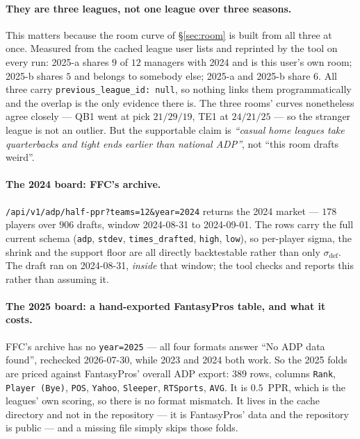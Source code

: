 \documentclass[10pt,a4paper]{article}
\theoremstyle{plain}
\theoremstyle{definition}
\theoremstyle{remark}
\newcommand{\code}[1]{\texttt{\small #1}}
\begin{document}
\paragraph{They are three leagues, not one league over three seasons.} This matters
because the room curve of \S\ref{sec:room} is built from all three at once. Measured from
the cached league user lists and reprinted by the tool on every run: 2025-a shares $9$ of
$12$ managers with 2024 and is this user's own room; 2025-b shares $5$ and belongs to
somebody else; 2025-a and 2025-b share $6$. All three carry \code{previous\_league\_id:
null}, so nothing links them programmatically and the overlap is the only evidence there
is. The three rooms' curves nonetheless agree closely --- QB1 went at pick $21 / 29 / 19$,
TE1 at $24 / 21 / 25$ --- so the stranger league is not an outlier. But the supportable
claim is \emph{``casual home leagues take quarterbacks and tight ends earlier than
national ADP''}, not ``this room drafts weird''.

\paragraph{The 2024 board: FFC's archive.}
\code{/api/v1/adp/half-ppr?teams=12\&year=2024} returns the 2024 market --- $178$ players
over $906$ drafts, window 2024-08-31 to 2024-09-01. The rows carry the full current schema
(\code{adp}, \code{stdev}, \code{times\_drafted}, \code{high}, \code{low}), so per-player
sigma, the shrink and the support floor are all directly backtestable rather than only
$\sigma_{\text{def}}$. The draft ran on 2024-08-31, \emph{inside} that window; the tool
checks and reports this rather than assuming it.

\paragraph{The 2025 board: a hand-exported FantasyPros table, and what it costs.}
FFC's archive has no \code{year=2025} --- all four formats answer ``No ADP data found'',
rechecked 2026-07-30, while 2023 and 2024 both work. So the 2025 folds are priced against
FantasyPros' overall ADP export: $389$ rows, columns \code{Rank}, \code{Player (Bye)},
\code{POS}, \code{Yahoo}, \code{Sleeper}, \code{RTSports}, \code{AVG}. It is $0.5$~PPR,
which is the leagues' own scoring, so there is no format mismatch. It lives in the cache
directory and not in the repository --- it is FantasyPros' data and the repository is
public --- and a missing file simply skips those folds.
\end{document}
